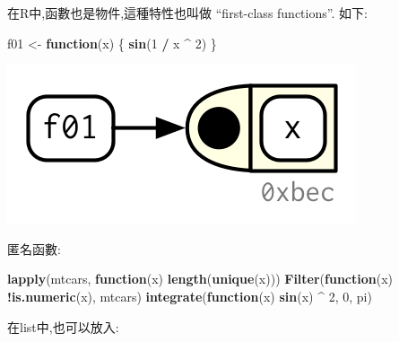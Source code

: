 \documentclass[]{book}
\newenvironment{Shaded}{\begin{snugshade}}{\end{snugshade}}
\newcommand{\ControlFlowTok}[1]{\textcolor[rgb]{0.13,0.29,0.53}{\textbf{#1}}}
\newcommand{\DataTypeTok}[1]{\textcolor[rgb]{0.13,0.29,0.53}{#1}}
\newcommand{\DecValTok}[1]{\textcolor[rgb]{0.00,0.00,0.81}{#1}}
\newcommand{\KeywordTok}[1]{\textcolor[rgb]{0.13,0.29,0.53}{\textbf{#1}}}
\newcommand{\NormalTok}[1]{#1}
\newcommand{\OperatorTok}[1]{\textcolor[rgb]{0.81,0.36,0.00}{\textbf{#1}}}
\newcommand{\StringTok}[1]{\textcolor[rgb]{0.31,0.60,0.02}{#1}}
\theoremstyle{definition}
\theoremstyle{definition}
\theoremstyle{definition}
\theoremstyle{remark}
\begin{document}
在R中,函數也是物件,這種特性也叫做 ``first-class functions''. 如下:

\begin{Shaded}
\begin{Highlighting}[]
\NormalTok{f01 <-}\StringTok{ }\ControlFlowTok{function}\NormalTok{(x) \{}
  \KeywordTok{sin}\NormalTok{(}\DecValTok{1} \OperatorTok{/}\StringTok{ }\NormalTok{x }\OperatorTok{^}\StringTok{ }\DecValTok{2}\NormalTok{)}
\NormalTok{\}}
\end{Highlighting}
\end{Shaded}

\begin{center}\includegraphics{diagrams/functions/first-class} \end{center}

匿名函數:

\begin{Shaded}
\begin{Highlighting}[]
\KeywordTok{lapply}\NormalTok{(mtcars, }\ControlFlowTok{function}\NormalTok{(x) }\KeywordTok{length}\NormalTok{(}\KeywordTok{unique}\NormalTok{(x)))}
\KeywordTok{Filter}\NormalTok{(}\ControlFlowTok{function}\NormalTok{(x) }\OperatorTok{!}\KeywordTok{is.numeric}\NormalTok{(x), mtcars)}
\KeywordTok{integrate}\NormalTok{(}\ControlFlowTok{function}\NormalTok{(x) }\KeywordTok{sin}\NormalTok{(x) }\OperatorTok{^}\StringTok{ }\DecValTok{2}\NormalTok{, }\DecValTok{0}\NormalTok{, pi)}
\end{Highlighting}
\end{Shaded}

在list中,也可以放入:

\begin{Shaded}
\end{Shaded}
\end{document}
